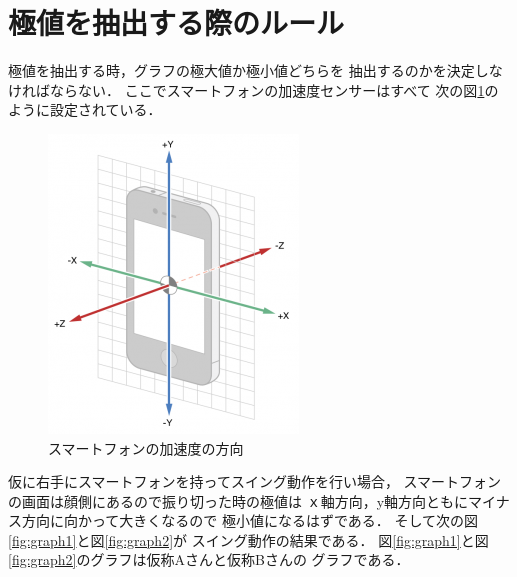     \section{極値を抽出する際のルール}
        極値を抽出する時，グラフの極大値か極小値どちらを
        抽出するのかを決定しなければならない．
        ここでスマートフォンの加速度センサーはすべて
        次の図\ref{fig:direction}のように設定されている．
        \begin{figure}[h]
            \vspace{50mm}
            \hspace{1.5cm}
            \includegraphics[scale=0.6]{images_S5/sumaho.eps}
            \caption{スマートフォンの加速度の方向}
            \label{fig:direction}
        \end{figure}
        仮に右手にスマートフォンを持ってスイング動作を行い場合，
        スマートフォンの画面は顔側にあるので振り切った時の極値は
        ｘ軸方向，y軸方向ともにマイナス方向に向かって大きくなるので
        極小値になるはずである．
        そして次の図\ref{fig:graph1}と図\ref{fig:graph2}が
        スイング動作の結果である．
        図\ref{fig:graph1}と図\ref{fig:graph2}のグラフは仮称Aさんと仮称Bさんの
        グラフである．
